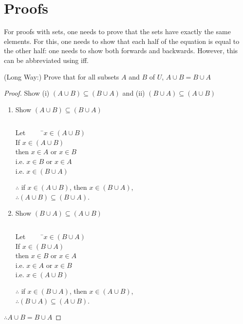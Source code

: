 \documentclass[\main/notes.tex]{subfiles}
\begin{document}
		\section{Proofs}
			For proofs with sets, one needs to prove that the sets have exactly the same elements. For this, one needs to show that each half of the equation is equal to the other half: one needs to show both forwards and backwards. However, this can be abbreviated using iff.
			\begin{example}
				(Long Way:) Prove that for all subsets $A$ and $B$ of $U$, $A \cup B = B \cup A$
				\begin{proof}
					Show (i) $(A \cup B) \subseteq (B \cup A)$ and (ii) $(B \cup A) \subseteq (A \cup B)$
					\begin{enumerate}[label=(\roman*)]
						\item Show $(A \cup B) \subseteq (B \cup A)$
							\begin{subproof}[Subproof]
								\removelastskip $ $
								\begin{tabbing}
									Let $\qquad$ \=$x \in (A \cup B)$\\
									If \>$x \in (A \cup B)$\\
									then \> $x \in A$ or $x \in B$\\
									i.e. \> $x \in B$ or $x \in A$\\
									i.e. \> $x \in (B \cup A)$
								\end{tabbing}
								$\therefore$ if $x \in (A \cup B)$, then $x \in (B \cup A)$,\\
								$\therefore (A \cup B) \subseteq (B \cup A)$.
							\end{subproof}
						\item Show $(B \cup A) \subseteq (A \cup B)$
							\begin{subproof}[Subproof]
								\removelastskip $ $
								\begin{tabbing}
									Let $\qquad$ \=$x \in (B \cup A)$\\
									If \>$x \in (B \cup A)$\\
									then \> $x \in B$ or $x \in A$\\
									i.e. \> $x \in A$ or $x \in B$\\
									i.e. \> $x \in (A \cup B)$
								\end{tabbing}
								$\therefore$ if $x \in (B \cup A)$, then $x \in (A \cup B)$,\\
								$\therefore (B \cup A) \subseteq (A \cup B)$.
							\end{subproof}
					\end{enumerate}
					$\therefore A \cup B = B \cup A$
				\end{proof}
			\end{example}
\end{document}

